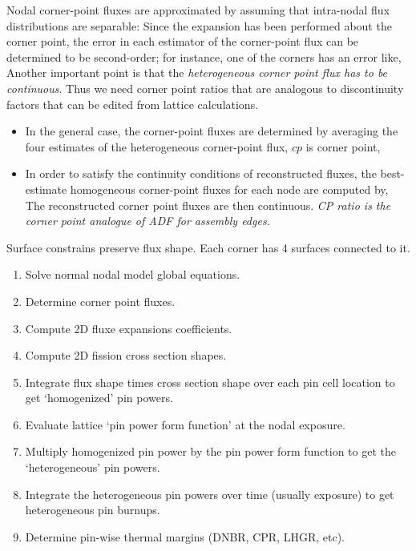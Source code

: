 \documentclass{school-22.211-notes}
\begin{document}
\clearpage
{}
Nodal corner-point fluxes are approximated by assuming that intra-nodal flux distributions are separable: 
Since the expansion has been performed about the corner point, the error in each estimator of the corner-point flux can be determined to be second-order; for instance, one of the corners has an error like, 
Another important point is that the \textit{heterogeneous corner point flux has to be continuous}. Thus we need corner point ratios that are analogous to discontinuity factors that can be edited from lattice calculations. 
\begin{itemize}
\item In the general case, the corner-point fluxes are determined by averaging the four estimates of the heterogeneous corner-point flux, $cp$ is corner point, 

\item In order to satisfy the continuity conditions of reconstructed fluxes, the best-estimate homogeneous corner-point fluxes for each node are computed by, 
  The reconstructed corner point fluxes are then continuous. \textit{CP ratio is the corner point analogue of ADF for assembly edges.}
\end{itemize}
Surface constrains preserve flux shape. Each corner has 4 surfaces connected to it. 


\clearpage
{}
\begin{enumerate}
\item Solve normal nodal model global equations.
\item Determine corner point fluxes. 
\item Compute 2D fluxe expansions coefficients. 
\item Compute 2D fission cross section shapes.
\item Integrate flux shape times cross section shape over each pin cell location to get `homogenized' pin powers. 
\item Evaluate lattice `pin power form function' at the nodal exposure. 
\item Multiply homogenized pin power by the pin power form function to get the `heterogeneous' pin powers.
\item Integrate the heterogeneous pin powers over time (usually exposure) to get heterogeneous pin burnups. 
\item Determine pin-wise thermal margins (DNBR, CPR, LHGR, etc). 
\end{enumerate}
\end{document}
